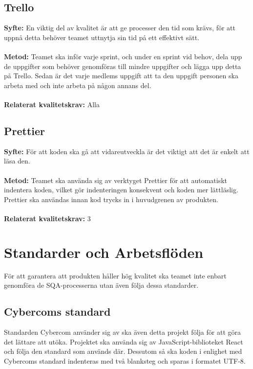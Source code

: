 \documentclass[10pt]{article}
\begin{document}
	
	\subsection{Trello}
	\textbf{Syfte:} En viktig del av kvalitet är att ge processer den tid som krävs, för att uppnå detta behöver teamet uttnytja sin tid på ett effektivt sätt.
	\\\\
	\textbf{Metod:} Teamet ska inför varje sprint, och under en sprint vid behov, dela upp de uppgifter som behöver genomföras till mindre uppgifter och lägga upp detta på Trello. Sedan är det varje medlems uppgift att ta den uppgift personen ska arbeta med och inte arbeta på någon annans del.
	\\\\
	\textbf{Relaterat kvalitetskrav:} Alla
	\\
	
	\subsection{Prettier}
	\textbf{Syfte:} För att koden ska gå att vidareutveckla är det viktigt att det är enkelt att läsa den.
	\\\\
	\textbf{Metod:} Teamet ska använda sig av verktyget Prettier för att automatiskt indentera koden, vilket gör indenteringen konsekvent och koden mer lättläslig. Prettier ska användas innan kod trycks in i huvudgrenen av produkten.
	\\\\
	\textbf{Relaterat kvalitetskrav:} 3
	\\
	
	
\pagebreak
\section{Standarder	och	Arbetsflöden}
	För att garantera att produkten håller hög kvalitet ska teamet inte enbart genomföra de SQA-processerna utan även följa dessa standarder.
	
	\subsection{Cybercoms standard}
	Standarden Cybercom använder sig av ska även detta projekt följa för att göra det lättare att utöka. Projektet ska använda sig av JavaScript-biblioteket React och följa den standard som används där. Dessutom så ska koden i enlighet med Cybercoms standard indenteras med två blanksteg och sparas i formatet UTF-8.
	
\end{document}
